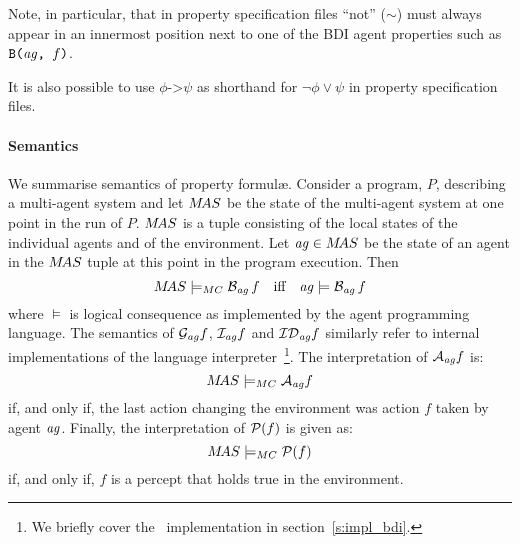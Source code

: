 Note, in particular, that in property specification files ``not'' ($\sim$) must always appear in an innermost position next to one of the BDI agent properties such as $\texttt{B(}\mathit{ag}\texttt{, }f\texttt{)}$.  

It is also possible to use $\phi \texttt{->} \psi$ as shorthand for $\neg \phi \vee \psi$ in property specification files.

\medskip

\paragraph{Semantics}
We summarise semantics of property formul\ae{}.
Consider a program, $P$, describing a multi-agent system and let
$M\!AS$ be the state of the multi-agent system at one point in the run
of $P$.  $M\!AS$ is a tuple consisting of the local states of the individual agents and of the environment. Let $\mathit{ag} \in M\!AS$ be the state of an agent in the $M\!AS$ tuple at this point in the 
program execution. Then 
$$
M\!AS \models_{MC} \mathrm{{\cal B}}_{\mathit{ag}} \, f \text{\quad iff\quad }
\mathit{ag} \models  \mathrm{{\cal B}}_{\mathit{ag}} \, f
$$
where $\models$ is logical consequence as implemented by the agent
programming language\index{$\lbeliefop$}. The semantics of $\mathrm{{\cal G}}_{\mathit{ag}} f$\index{$\lgoalop$}, $\mathrm{{\cal I}}_{\mathit{ag}} f$\index{$\lintentionfunc$} and $\mathrm{{\cal ID}}_{\mathit{ag}} f$\index{$\lintendtodofunc$} similarly refer to internal implementations of the language interpreter~\footnote{We briefly cover the \gwendolen\ implementation in section~\ref{s:impl_bdi}.}.  
The interpretation of $\mathrm{{\cal A}}_{\mathit{ag}} f$\index{$\lactionsfunc$} is:
$$M\!AS \models_{MC}
\mathrm{{\cal A}}_{\mathit{ag}} f$$ if, and only if, the last action changing
the environment was action $f$ taken by agent $\mathit{ag}$.  Finally, the interpretation of
$\mathrm{{\cal P}}(f)$ is given as:
$$M\!AS
\models_{MC} \mathrm{{\cal P}}(f)$$\index{$\lperceptfunc$} if, and only if, $f$ is a percept that
holds true in the environment.
\medskip

